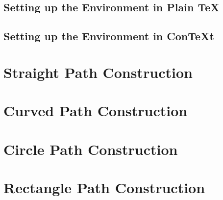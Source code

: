 \documentclass{memoir}
\begin{document}
\subsection{Setting up the Environment in Plain \TeX}
\lipsum
\subsection{Setting up the Environment in Con\TeX t}
\lipsum
\section{Straight Path Construction}
\lipsum
\section{Curved Path Construction}
\lipsum
\section{Circle Path Construction}
\lipsum
\section{Rectangle Path Construction}
\lipsum
\end{document}
